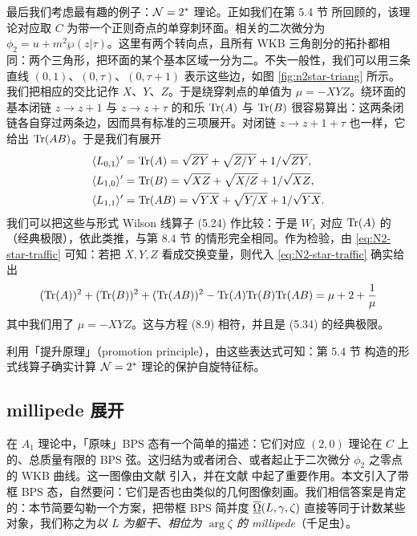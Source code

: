 最后我们考虑最有趣的例子：$\mathcal{N}=2^*$ 理论。正如我们在第 5.4 节%
所回顾的，该理论对应取 $C$ 为带一个正则奇点的单穿刺环面。相关的二次微分为 $\phi_2 = u + m^2 \wp(z|\tau)$。这里有两个转向点，且所有 WKB 三角剖分的拓扑都相同：两个三角形，把环面的某个基本区域一分为二。不失一般性，我们可以用三条直线 $(0,1)$、$(0,\tau)$、$(0,\tau+1)$ 表示这些边，如图 \ref{fig:n2star-triang} 所示。我们把相应的交比记作 $X$、$Y$、$Z$。于是绕穿刺点的单值为 $\mu = - XYZ$。绕环面的基本闭链 $z \to z+1$ 与 $z \to z+\tau$ 的和乐 ${\rm Tr}(A)$ 与 ${\rm Tr}(B)$ 很容易算出：这两条闭链各自穿过两条边，因而具有标准的三项展开。对闭链 $z \to z+1+\tau$ 也一样，它给出 ${\rm Tr}(AB)$。于是我们有展开
%
\begin{align}\label{eq:N2-star-traffic}
\langle L_{0,1} \rangle' &= {\rm Tr}(A) = \sqrt{Z Y} + \sqrt{Z/Y} + 1/\sqrt{Z Y}, \\
\langle L_{1,0} \rangle' &= {\rm Tr}(B) = \sqrt{X Z} + \sqrt{X/Z} + 1/\sqrt{X Z}, \\
\langle L_{1,1} \rangle' &= {\rm Tr}(AB) = \sqrt{Y X} + \sqrt{Y/X} + 1/\sqrt{Y X}.
\end{align}
%
我们可以把这些与形式 Wilson 线算子 (5.24)%
作比较：于是 $W_1$ 对应 ${\rm Tr}(A)$ 的（经典极限），依此类推，与第 8.4 节%
的情形完全相同。作为检验，由 \eqref{eq:N2-star-traffic} 可知：若把 $X, Y, Z$ 看成交换变量，则代入 \eqref{eq:N2-star-traffic} 确实给出
%
\begin{equation}
({\rm Tr}(A))^2 + ({\rm Tr}(B))^2 + ({\rm Tr}(AB))^2 - {\rm Tr}(A) {\rm Tr}(B) {\rm Tr}(AB) = \mu + 2 + \frac{1}{\mu}
\end{equation}
%
其中我们用了 $\mu = - XYZ$。这与方程 (8.9)%
相符，并且是 (5.34)%
的经典极限。

利用「提升原理」（promotion principle），由这些表达式可知：第 5.4 节%
构造的形式线算子确实计算 $\mathcal{N}=2^*$ 理论的保护自旋特征标。

\subsection{millipede 展开}

在 $A_1$ 理论中，「原味」BPS 态有一个简单的描述：它们对应 $(2,0)$ 理论在 $C$ 上的、总质量有限的 BPS 弦。这归结为或者闭合、或者起止于二次微分 $\phi_2$ 之零点的 WKB 曲线。这一图像由文献 \cite{Klemm:1996bj,Shapere:1999xr} 引入，并在文献 \cite{Gaiotto:2009hg} 中起了重要作用。本文引入了带框 BPS 态，自然要问：它们是否也由类似的几何图像刻画。我们相信答案是肯定的：本节简要勾勒一个方案，把带框 BPS 简并度 $\overline{\underline{\Omega}}(L, \gamma, \zeta)$ 直接等同于计数某些对象，我们称之为\emph{以 $L$ 为躯干、相位为 $\arg \zeta$ 的 millipede}（千足虫）。

